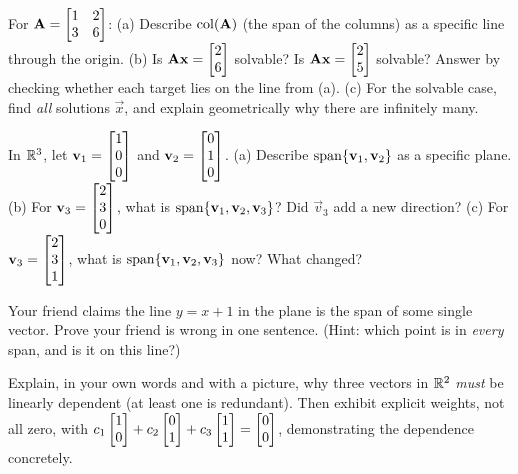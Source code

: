 \begin{exercise}\label{ch03:ex-target}
For $\mathbf{A} = \begin{bmatrix} 1 & 2 \\ 3 & 6 \end{bmatrix}$:
(a) Describe $\operatorname{col}(\mathbf{A})$ (the span of the columns) as a specific line through the origin.
(b) Is $\mathbf{A}\mathbf{x} = \begin{bmatrix}2\\6\end{bmatrix}$ solvable? Is $\mathbf{A}\mathbf{x} = \begin{bmatrix}2\\5\end{bmatrix}$ solvable? Answer by checking whether each target lies on the line from (a).
(c) For the solvable case, find \emph{all} solutions $\vec{x}$, and explain geometrically why there are infinitely many.
\end{exercise}

\begin{exercise}\label{ch03:ex-third}
In $\mathbb{R}^3$, let $\mathbf{v}_1 = \begin{bmatrix}1\\0\\0\end{bmatrix}$ and $\mathbf{v}_2 = \begin{bmatrix}0\\1\\0\end{bmatrix}$.
(a) Describe $\operatorname{span}\{\mathbf{v}_1,\mathbf{v}_2\}$ as a specific plane.
(b) For $\mathbf{v}_3 = \begin{bmatrix}2\\3\\0\end{bmatrix}$, what is $\operatorname{span}\{\mathbf{v}_1,\mathbf{v}_2,\mathbf{v}_3\}$? Did $\vec{v}_3$ add a new direction?
(c) For $\mathbf{v}_3 = \begin{bmatrix}2\\3\\1\end{bmatrix}$, what is $\operatorname{span}\{\mathbf{v}_1,\mathbf{v}_2,\mathbf{v}_3\}$ now? What changed?
\end{exercise}

\begin{exercise}\label{ch03:ex-affine}
Your friend claims the line $y = x + 1$ in the plane is the span of some single vector. Prove your friend is wrong in one sentence. (Hint: which point is in \emph{every} span, and is it on this line?)
\end{exercise}

\begin{exercise}\label{ch03:ex-counting}
Explain, in your own words and with a picture, why three vectors in $\mathbb{R}^2$ \emph{must} be linearly dependent (at least one is redundant). Then exhibit explicit weights, not all zero, with $c_1\begin{bmatrix}1\\0\end{bmatrix} + c_2\begin{bmatrix}0\\1\end{bmatrix} + c_3\begin{bmatrix}1\\1\end{bmatrix} = \begin{bmatrix}0\\0\end{bmatrix}$, demonstrating the dependence concretely.
\end{exercise}

